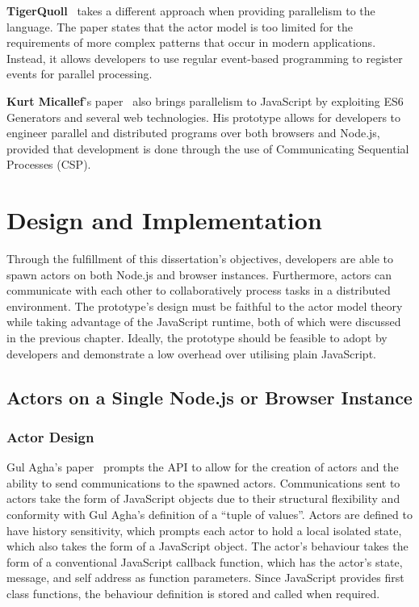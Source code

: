 \documentclass[lettersize,journal]{IEEEtran}
\begin{document}
\textbf{TigerQuoll}~\cite{tigerquoll} takes a different approach when providing parallelism to the language. The paper states that the actor model is too limited for the requirements of more complex patterns that occur in modern applications. Instead, it allows developers to use regular event-based programming to register events for parallel processing. 

\textbf{Kurt Micallef}'s paper~\cite{kurt} also brings parallelism to JavaScript by exploiting ES6 Generators and several web technologies. His prototype allows for developers to engineer parallel and distributed programs over both browsers and Node.js, provided that development is done through the use of Communicating Sequential Processes (CSP).
\section{Design and Implementation}
Through the fulfillment of this dissertation's objectives, developers are able to spawn actors on both Node.js and browser instances. Furthermore, actors can communicate with each other to collaboratively process tasks in a distributed environment. The prototype's design must be faithful to the actor model theory while taking advantage of the JavaScript runtime, both of which were discussed in the previous chapter. Ideally, the prototype should be feasible to adopt by developers and demonstrate a low overhead over utilising plain JavaScript.

\subsection{Actors on a Single Node.js or Browser Instance}
\subsubsection{Actor Design}
Gul Agha's paper~\cite{agha1985actors} prompts the API to allow for the creation of actors and the ability to send communications to the spawned actors. Communications sent to actors take the form of JavaScript objects due to their structural flexibility and conformity with Gul Agha's definition of a “tuple of values”. Actors are defined to have history sensitivity, which prompts each actor to hold a local isolated state, which also takes the form of a JavaScript object. The actor's behaviour takes the form of a conventional JavaScript callback function, which has the actor's state, message, and self address as function parameters. Since JavaScript provides first class functions, the behaviour definition is stored and called when required.
\end{document}
